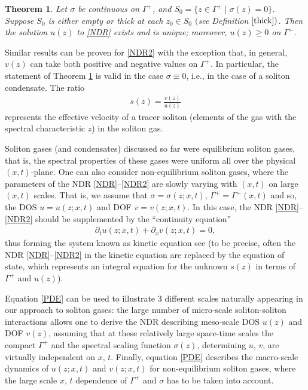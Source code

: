 \documentclass[10pt,a4paper]{amsart}
\numberwithin{equation}{section}
\newtheorem{Theorem}{Theorem}[section]
\newcommand{\G}{\Gamma}
\def\s{ {\sigma}}
\def\s{\sigma}
\def\G{\Gamma}
\begin{document}
\begin{Theorem} \label{secondthm}
Let $\sigma$ be continuous on $\Gamma^+$, and
$S_0 = \bigl\{ z \in \Gamma^+ \mid \sigma(z) = 0 \bigr\}$.
Suppose $S_0$ is either empty or thick at each $z_0 \in S_0$
$($see Definition $\ref{thick})$. 	Then
the solution $u(z)$ to
\eqref{NDR} exists and is unique; moreover, $u(z)\geq 0$ on $\G^+$.
\end{Theorem}
Similar results can be proven for
\eqref{NDR2} with the exception
that, in general, $v(z)$ can take both positive and negative values on $\G^+$.
In particular, the statement of Theorem \ref{secondthm} is valid in the case $\s\equiv 0$, i.e., in the case of a soliton condensate. The ratio
\begin{gather}\label{v-eff}
s(z)=\frac{v(z)}{u(z)}
\end{gather}
represents the effective velocity of a tracer soliton (elements of the gas with the spectral characteristic $z$) in the soliton gas.


Soliton gases (and condensates) discussed so far were equilibrium soliton gases, that is, the spectral properties of these gases were uniform all over the physical $ (x,t)$-plane. One can also consider non-equilibrium soliton gases, where the parameters of the NDR \eqref{NDR}--\eqref{NDR2} are slowly varying with $ (x,t)$ on large $ (x,t)$ scales. That is, we assume that $\s=\s(z;x,t)$, $\G^+=\G^+(x,t)$ and so, the DOS $u=u(z;x,t)$ and DOF $v=v(z;x,t)$. In this case, the NDR \eqref{NDR}--\eqref{NDR2} should be supplemented by the ``continuity equation''
\begin{gather}\label{PDE}
\partial_t u(z;x,t)+\partial_x v(z;x,t)=0,
\end{gather}
thus forming the system known as kinetic equation see \cite{ET2020} (to be precise, often the NDR \eqref{NDR}--\eqref{NDR2} in the kinetic equation are replaced by the equation of state, which represents an integral equation for the unknown $s(z)$ in terms of $\G^+$ and $u(z)$).

Equation \eqref{PDE} can be used to illustrate 3 different scales naturally appearing in our approach to soliton gases: the large number of micro-scale soliton-soliton interactions allows one to derive the NDR describing meso-scale DOS $u(z)$ and DOF $v(z)$, assuming that at these relatively large space-time scales the compact $\G^+$ and the spectral scaling function $\s(z)$, determining $u$, $v$, are virtually independent on $x$, $t$. Finally, equation \eqref{PDE} describes the macro-scale dynamics of $u(z;x,t)$ and $v(z;x,t)$ for non-equilibrium soliton gases, where the large scale $x$, $t$ dependence of $\G^+$ and $\s$ has to be taken into account.
\end{document}
